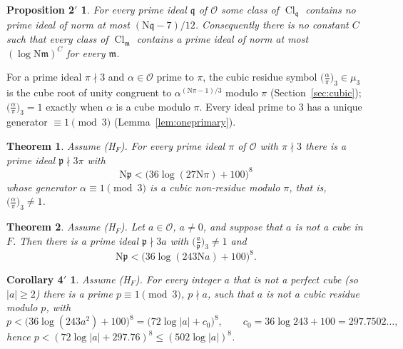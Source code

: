 \documentclass[11pt]{article}
\newtheorem{mainthm}{Theorem}
\newtheorem*{propprime}{Proposition 2$'$}
\newtheorem*{corprime}{Corollary 4$'$}
\theoremstyle{definition}
\theoremstyle{remark}
\numberwithin{equation}{section}
\newcommand{\cO}{\mathcal O}
\newcommand{\fp}{\mathfrak p}
\newcommand{\fm}{\mathfrak m}
\newcommand{\fq}{\mathfrak q}
\newcommand{\Nm}{\mathrm N}
\newcommand{\Cl}{\operatorname{Cl}}
\newcommand{\cubic}[2]{\bigl(\tfrac{#1}{#2}\bigr)_{3}}
\newcommand{\HF}{\textup{(H$_F$)}}
\begin{document}
\begin{propprime}
For every prime ideal $\fq$ of $\cO$ some class of $\Cl_\fq$ contains no prime ideal of norm at most $(\Nm\fq-7)/12$. Consequently there is no constant $C$ such that every class of $\Cl_\fm$ contains a prime ideal of norm at most $(\log\Nm\fm)^{C}$ for every $\fm$.
\end{propprime}

For a prime ideal $\pi\nmid3$ and $\alpha\in\cO$ prime to $\pi$, the cubic residue symbol $\cubic{\alpha}{\pi}\in\mu_3$ is the cube root of unity congruent to $\alpha^{(\Nm\pi-1)/3}$ modulo $\pi$ (Section~\ref{sec:cubic}); $\cubic{\alpha}{\pi}=1$ exactly when $\alpha$ is a cube modulo $\pi$. Every ideal prime to $3$ has a unique generator $\equiv1\pmod3$ (Lemma~\ref{lem:oneprimary}).

\begin{mainthm}\label{thm:3}
Assume \HF. For every prime ideal $\pi$ of $\cO$ with $\pi\nmid3$ there is a prime ideal $\fp\nmid3\pi$ with
\[
 \Nm\fp<\bigl(36\log(27\Nm\pi)+100\bigr)^8
\]
whose generator $\alpha\equiv1\pmod3$ is a cubic non-residue modulo $\pi$, that is, $\cubic{\alpha}{\pi}\ne1$.
\end{mainthm}

\begin{mainthm}\label{thm:4}
Assume \HF. Let $a\in\cO$, $a\ne0$, and suppose that $a$ is not a cube in $F$. Then there is a prime ideal $\fp\nmid3a$ with $\cubic{a}{\fp}\ne1$ and
\[
 \Nm\fp<\bigl(36\log(243\Nm a)+100\bigr)^8 .
\]
\end{mainthm}

\begin{corprime}
Assume \HF. For every integer $a$ that is not a perfect cube (so $|a|\ge2$) there is a prime $p\equiv1\pmod3$, $p\nmid a$, such that $a$ is not a cubic residue modulo $p$, with
\[
 p<\bigl(36\log(243a^2)+100\bigr)^8=\bigl(72\log|a|+c_0\bigr)^8,\qquad c_0=36\log243+100=297.7502\ldots,
\]
hence $p<(72\log|a|+297.76)^8\le(502\log|a|)^8$.
\end{corprime}
\end{document}
